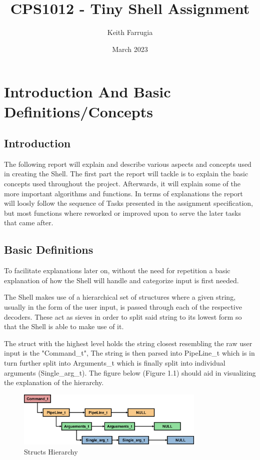 \documentclass[12pt, a4paper]{report}
\title{CPS1012 - Tiny Shell Assignment}
\author{Keith Farrugia}
\date{March 2023}
\begin{document}
\maketitle
\newpage
\tableofcontents
\newpage
\chapter{Introduction And Basic Definitions/Concepts}


\section{Introduction}
The following report will explain and describe various aspects and concepts used in creating the Shell. The first part the report will tackle is to explain the basic concepts used throughout the project. Afterwards, it will explain some of the more important algorithms and functions. In terms of explanations the report will loosly follow the sequence of Tasks presented in the assignment specification, but most functions where reworked or improved upon to serve the later tasks that came after.

\section{Basic Definitions}
To facilitate explanations later on, without the need for repetition a basic explanation of how the Shell will handle and categorize input is first needed.

The Shell makes use of a hierarchical set of structures where a given string, usually in the form of the user input, is passed through each of the respective decoders. These act as sieves in order to split said string to its lowest form so that the Shell is able to make use of it.

The struct with the highest level holds the string closest resembling the raw user input is the "Command\_t", The string is then parsed into PipeLine\_t which is in turn further split into Arguments\_t which is finally split into individual arguments (Single\_arg\_t). The figure below (Figure 1.1) should aid in visualizing the explanation of the hierarchy.

\begin{figure}[!htp]
    \centering
    \includegraphics[width=9cm]
    {Diagrams/Structs_Basic.png}
    \caption{Structs Hierarchy}
\end{figure}
\end{document}
